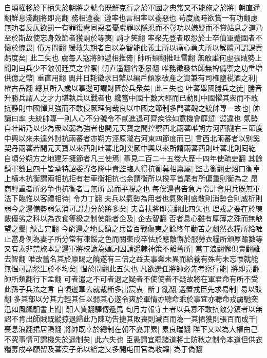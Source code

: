 自頃權移於下柄失於朝將之號令既鮮克行之於軍國之典常又不能施之於將|{
	朝直遥翻鮮息淺翻將即亮翻}
務相遵養|{
	遵率也言相率以養惡也}
苟度歲時欲賞一有功翻慮無功者反仄欲罰一有罪復慮同惡者憂虞罪以隱忍而不彰功以嫌疑而不賞姑息之道乃至於斯故使忘身效節者獲誚於等夷|{
	誚才笑翻}
率衆先登者取怨於士卒僨軍蹙國者不懷於愧畏|{
	僨方問翻}
緩救失期者自以為智能此義士所以痛心勇夫所以解體可謂課責虧度矣|{
	此二失也}
虜每入寇將帥遞相推倚|{
	帥所類翻推吐雷翻}
無敢誰何虛張賊勢上聞則曰兵少不敵朝廷莫之省察|{
	朝直遥翻省悉景翻}
唯務徵發益師無禆備禦之功重增供億之幣|{
	重直用翻}
閭井日耗徵求日繁以編戶傾家破產之資兼有司榷鹽税酒之利|{
	榷古岳翻}
總其所入歲以事邊可謂財匱於兵衆矣|{
	此三失也}
吐蕃舉國勝兵之徒|{
	勝音升勝兵謂人之才力堪執兵以戰者也}
纔當中國十數大郡而已動則中國懼其衆而不敢抗静則中國憚其強而不敢侵厥理何哉良以中國之節制多門蕃醜之統帥專一故也|{
	帥讀曰率}
夫統帥專一則人心不分號令不貳進退可齊疾徐如意機會靡愆|{
	愆違也}
氣勢自壮斯乃以少為衆以弱為強者也開元天寶之間控禦西北兩蕃唯朔方河西隴右三節度中興以來未遑外討抗兩蕃者亦朔方涇原隴右河東四節度而已|{
	言西北兩蕃者以别奚契丹兩蕃若開元天寶以來西則吐蕃北則突厥中興以來所謂兩蕃西則吐蕃北則囘紇}
自頃分朔方之地建牙擁節者凡三使焉|{
	事見二百二十五卷大歷十四年使疏吏翻}
其餘鎮軍數且四十皆承特詔委寄各降中貴監臨人得抗衡莫相禀屬|{
	監古銜翻史炤曰衡車上横木抗衡謂兩相抗拒有若車衡相抗也余謂衡所以揆平首尾有所偏重則衡為之昂商輕重者所必争也抗衡者言無所昂而平視之也}
每俟邊書告急方令計會用兵既無軍法下臨惟以客禮相待|{
	令力丁翻}
夫兵以氣勢為用者也氣聚則盛散則消勢合則威析則弱今之邊備勢弱氣消可謂力分於將多矣|{
	夫音扶將即亮翻此四失也}
理戎之要在於練覈優劣之科以為衣食等級之制使能者企及|{
	企去智翻}
否者息心雖有厚薄之殊而無觖望之釁|{
	觖古宂翻}
今窮邊之地長鎮之兵皆百戰傷夷之餘終年勤苦之劇然衣糧所給唯止當身例為妻子所分常有凍餒之色而關東戍卒怯於應敵懈於服勞衣糧所頒厚踰數等又有素非禁旅本是邊軍將校詭為媚詞因請遥隸神策不離舊所|{
	當丁浪翻懈俱賣翻離去智翻}
唯改舊名其於廪賜之饒遂有三倍之益夫事業未異而給養有殊苟未忘懷就能無愠可謂怨生於不均矣|{
	愠於問翻此五失也}
凡欲選任將帥必先考察行能|{
	將即亮翻帥所類翻行下孟翻}
可者遣之不可者退之疑者不使使者不疑故將在軍君命有所不受|{
	此孫子兵法之言}
自頃邊軍去就裁斷多出宸衷|{
	斷丁亂翻}
選置戎臣先求易制|{
	易以䜴翻}
多其部以分其力輕其任以弱其心遂令爽於軍情亦聽命乖於事宜亦聽命戎虜馳突迅如風飊馹書上聞|{
	馹人質翻驛傳遞馬}
旬月方報守土者以兵寡不敢抗敵分鎮者以無詔不肯出師賊既縱掠退歸此乃陳功告捷其敗喪則減百而為一其捃獲則張百而成千|{
	喪息浪翻捃居隕翻}
將帥既幸於總制在朝不憂罪累|{
	累良瑞翻}
陛下又以為大權由己不究事情可謂機失於遥制矣|{
	此六失也}
臣愚謂宜罷諸道將士防秋之制令本道但供衣糧募戍卒願留及蕃漢子弟以給之又多開屯田官為收糴|{
	為于偽翻}
